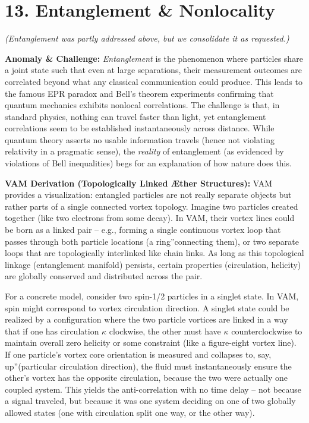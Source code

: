 \documentclass[a4paper, aps,preprint,superscriptaddress, 12pt]{revtex4}
\begin{document}
\section*{13. Entanglement \& Nonlocality}

\textit{(Entanglement was partly addressed above, but we consolidate it as requested.)}


\textbf{Anomaly \& Challenge: } \textit{Entanglement} is the phenomenon where particles share a joint state such that even at large separations, their measurement outcomes are correlated beyond what any classical communication could produce. This leads to the famous EPR paradox and Bell's theorem experiments confirming that quantum mechanics exhibits nonlocal correlations. The challenge is that, in standard physics, nothing can travel faster than light, yet entanglement correlations seem to be established instantaneously across distance. While quantum theory asserts no usable information travels (hence not violating relativity in a pragmatic sense), the \textit{reality} of entanglement (as evidenced by violations of Bell inequalities) begs for an explanation of how nature does this.


\textbf{VAM Derivation (Topologically Linked Æther Structures):} VAM provides a visualization: entangled particles are not really separate objects but rather parts of a single connected vortex topology. Imagine two particles created together (like two electrons from some decay). In VAM, their vortex lines could be born as a linked pair – e.g., forming a single continuous vortex loop that passes through both particle locations (a \grqq ring\textquotedblright connecting them), or two separate loops that are topologically interlinked like chain links. As long as this topological linkage (entanglement manifold) persists, certain properties (circulation, helicity) are globally conserved and distributed across the pair.


For a concrete model, consider two spin-1/2 particles in a singlet state. In VAM, spin might correspond to vortex circulation direction. A singlet state could be realized by a configuration where the two particle vortices are linked in a way that if one has circulation $\kappa$ clockwise, the other must have $\kappa$ counterclockwise to maintain overall zero helicity or some constraint (like a figure-eight vortex line). If one particle's vortex core orientation is measured and collapses to, say, \grqq up\textquotedblright (particular circulation direction), the fluid must instantaneously ensure the other's vortex has the opposite circulation, because the two were actually one coupled system. This yields the anti-correlation with no time delay – not because a signal traveled, but because it was one system deciding on one of two globally allowed states (one with circulation split one way, or the other way).
\end{document}
